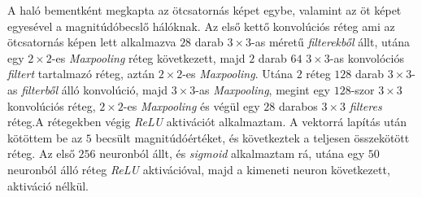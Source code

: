 \documentclass[12pt,letterpaper,twoside,openright]{book}
\begin{document}
A haló bementként megkapta az ötcsatornás képet egybe, valamint az öt képet egyesével a magnitúdóbecslő hálóknak. Az első kettő konvolúciós réteg ami az ötcsatornás képen lett alkalmazva $28$ darab $3\times3$-as méretű \textit{filterekből} állt, utána egy $2\times 2$-es \textit{Maxpooling} réteg következett, majd $2$ darab $64$ $3\times 3$-as konvolóciós \textit{filtert} tartalmazó réteg, aztán $2\times 2$-es \textit{Maxpooling}. Utána $2$ réteg $128$ darab $3\times 3$-as \textit{filterből} álló konvolúció, majd $3\times 3$-as \textit{Maxpooling}, megint egy $128$-szor $3\times 3$ konvolúciós réteg, $2\times 2$-es \textit{Maxpooling} és végül egy $28$ darabos $3\times 3$ \textit{filteres} réteg.A rétegekben végig \textit{ReLU} aktivációt alkalmaztam. A vektorrá lapítás után kötöttem be az $5$ becsült magnitúdóértéket, és következtek a teljesen összekötött réteg. Az első $256$ neuronból állt, és \textit{sigmoid} alkalmaztam rá, utána egy $50$ neuronból álló réteg \textit{ReLU} aktivációval, majd a kimeneti neuron következett, aktiváció nélkül.
\end{document}
